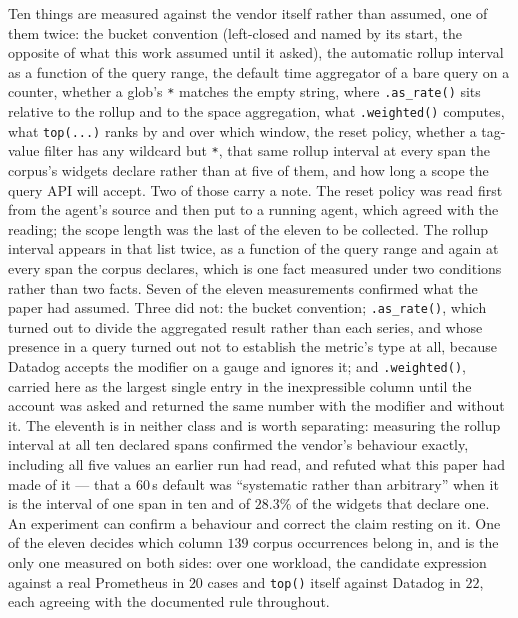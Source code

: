 Ten things are measured against the vendor itself rather than assumed, one of them
twice: the bucket
convention (left-closed and named by its start, the opposite of what this work assumed
until it asked), the automatic rollup interval as a function of the query range, the
default time aggregator of a bare query on a counter, whether a glob's \texttt{*} matches
the empty string, where \texttt{.as\_rate()} sits relative to the rollup and to the space
aggregation, what \texttt{.weighted()} computes, what \texttt{top(...)} ranks by and over
which window, the reset policy,
whether a tag-value filter has any wildcard but \texttt{*}, that same rollup interval at
every span the corpus's widgets declare rather than at five of them, and how long a
scope the query API will accept. Two of those carry a note. The reset policy was read
first from the agent's source and then put to a running agent, which agreed with the
reading; the scope length was the last of the eleven to be collected.
The rollup interval appears in that list twice, as a function of the query range and
again at every span the corpus declares, which is one fact measured under two
conditions rather than two facts. Seven of the eleven measurements confirmed what
the paper had assumed. Three did not: the bucket convention;
\texttt{.as\_rate()}, which turned out to divide the aggregated result rather than
each series, and whose presence in a query turned out not to establish the metric's type
at all, because Datadog accepts the modifier on a gauge and ignores it; and
\texttt{.weighted()}, carried here as the largest single entry in the inexpressible
column until the account was asked and returned the same number with the modifier and without it. The eleventh is in neither class and is worth
separating: measuring the rollup interval at all ten declared spans confirmed the
vendor's behaviour exactly, including all five values an earlier run had read, and
refuted what this paper had made of it --- that a $60$\,s default was ``systematic
rather than arbitrary'' when it is the interval of one span in ten and of $28.3\%$ of
the widgets that declare one. An experiment can confirm a behaviour and correct the
claim resting on it. One of the eleven decides which column $139$ corpus occurrences belong in, and is the only one
measured on both sides: over one workload, the candidate expression against a real
Prometheus in $20$ cases and \texttt{top()} itself against Datadog in $22$, each
agreeing with the documented rule throughout.

